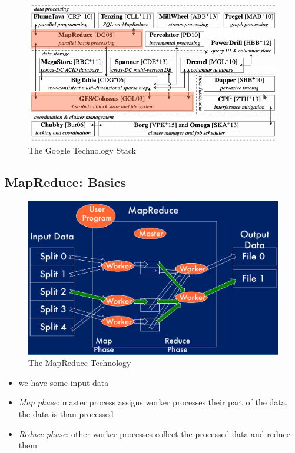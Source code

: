 \documentclass[a4paper]{article}
\begin{document}
\begin{multicols}{3}
\begin{figure}[H]
    \includegraphics[width=\linewidth]{GoogleTechnologyStack.png}
    \caption{The Google Technology Stack}
    \label{fig:googlestack}
\end{figure}

\subsection*{MapReduce: Basics}
\begin{figure}[H]
    \includegraphics[width=\linewidth]{MapReduce.png}
    \caption{The MapReduce Technology}
    \label{fig:mapreduce}
\end{figure}

\begin{itemize}
    \item we have some input data
    \item \textit{Map phase}: master process assigns worker processes their part of the data, the data is than processed 
    \item \textit{Reduce phase}: other worker processes collect the processed data and reduce them
\end{itemize}


\end{multicols}
\end{document}
